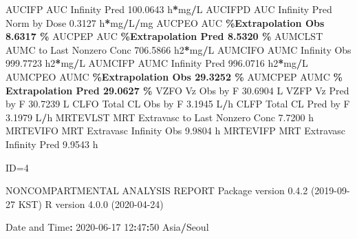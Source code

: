 \documentclass[
  12pt,
]{krantz}
\newenvironment{Shaded}{\begin{snugshade}}{\end{snugshade}}
\newcommand{\DecValTok}[1]{\textcolor[rgb]{0.00,0.00,0.81}{#1}}
\newcommand{\FloatTok}[1]{\textcolor[rgb]{0.00,0.00,0.81}{#1}}
\newcommand{\NormalTok}[1]{#1}
\newcommand{\OperatorTok}[1]{\textcolor[rgb]{0.81,0.36,0.00}{\textbf{#1}}}
\newcommand{\StringTok}[1]{\textcolor[rgb]{0.31,0.60,0.02}{#1}}
\begin{document}
\begin{Shaded}
\begin{Highlighting}[]
\NormalTok{AUCIFP     AUC Infinity Pred                             }\FloatTok{100.0643}\NormalTok{ h}\OperatorTok{*}\NormalTok{mg}\OperatorTok{/}\NormalTok{L}
\NormalTok{AUCIFPD    AUC Infinity Pred Norm by Dose                  }\FloatTok{0.3127}\NormalTok{ h}\OperatorTok{*}\NormalTok{mg}\OperatorTok{/}\NormalTok{L}\OperatorTok{/}\NormalTok{mg}
\NormalTok{AUCPEO     AUC }\OperatorTok{\%Extrapolation Obs                          8.6317 \%}
\NormalTok{AUCPEP     AUC }\OperatorTok{\%Extrapolation Pred                         8.5320 \%}
\NormalTok{AUMCLST    AUMC to Last Nonzero Conc                     }\FloatTok{706.5866}\NormalTok{ h2}\OperatorTok{*}\NormalTok{mg}\OperatorTok{/}\NormalTok{L}
\NormalTok{AUMCIFO    AUMC Infinity Obs                             }\FloatTok{999.7723}\NormalTok{ h2}\OperatorTok{*}\NormalTok{mg}\OperatorTok{/}\NormalTok{L}
\NormalTok{AUMCIFP    AUMC Infinity Pred                            }\FloatTok{996.0716}\NormalTok{ h2}\OperatorTok{*}\NormalTok{mg}\OperatorTok{/}\NormalTok{L}
\NormalTok{AUMCPEO    AUMC }\OperatorTok{\%Extrapolation Obs                        29.3252 \%}
\NormalTok{AUMCPEP    AUMC }\OperatorTok{\% Extrapolation Pred                      29.0627 \%}
\NormalTok{VZFO       Vz Obs by F                                    }\FloatTok{30.6904}\NormalTok{ L}
\NormalTok{VZFP       Vz Pred by F                                   }\FloatTok{30.7239}\NormalTok{ L}
\NormalTok{CLFO       Total CL Obs by F                               }\FloatTok{3.1945}\NormalTok{ L}\OperatorTok{/}\NormalTok{h}
\NormalTok{CLFP       Total CL Pred by F                              }\FloatTok{3.1979}\NormalTok{ L}\OperatorTok{/}\NormalTok{h}
\NormalTok{MRTEVLST   MRT Extravasc to Last Nonzero Conc              }\FloatTok{7.7200}\NormalTok{ h}
\NormalTok{MRTEVIFO   MRT Extravasc Infinity Obs                      }\FloatTok{9.9804}\NormalTok{ h}
\NormalTok{MRTEVIFP   MRT Extravasc Infinity Pred                     }\FloatTok{9.9543}\NormalTok{ h}





\NormalTok{ID=}\DecValTok{4}

\NormalTok{                        NONCOMPARTMENTAL ANALYSIS REPORT}
\NormalTok{                       Package version }\DecValTok{0}\NormalTok{.}\FloatTok{4.2}\NormalTok{ (}\DecValTok{2019{-}09{-}27}\NormalTok{ KST)}
\NormalTok{                          R version }\DecValTok{4}\NormalTok{.}\FloatTok{0.0}\NormalTok{ (}\DecValTok{2020{-}04{-}24}\NormalTok{)}

\NormalTok{Date and Time}\OperatorTok{:}\StringTok{ }\DecValTok{2020{-}06{-}17} \DecValTok{12}\OperatorTok{:}\DecValTok{47}\OperatorTok{:}\DecValTok{50}\NormalTok{ Asia}\OperatorTok{/}\NormalTok{Seoul}


\end{Highlighting}
\end{Shaded}
\end{document}
